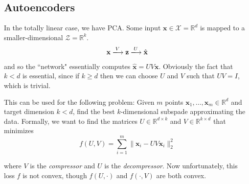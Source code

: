 \documentclass{article}
\begin{document}
\subsection{Autoencoders}

  In the totally linear case, we have PCA. Some input $\mathbf{x} \in \mathcal{X} = \mathbb{R}^d$ is mapped to a smaller-dimensional $\mathcal{Z} = \mathbb{R}^k$. 
  \begin{equation}
    \mathbf{x} \xlongrightarrow[]{V} \mathbf{z} \xlongrightarrow{U} \hat{\mathbf{x}}
  \end{equation}
  and so the ``network" essentially computes $\hat{\mathbf{x}} = U V \mathbf{x}$. Obviously the fact that $k < d$ is essential, since if $k \geq d$ then we can choose $U$ and $V$ such that $UV = I$, which is trivial. 

  This can be used for the following problem: Given $m$ points $\mathbf{x}_1, \ldots, \mathbf{x}_m \in \mathbb{R}^d$ and target dimension $k < d$, find the best $k$-dimensional subspade approximating the data. Formally, we want to find the matrices $U \in \mathbb{R}^{d \times k}$ and $V \in \mathbb{R}^{k \times d}$ that minimizes 
  \begin{equation}
    f(U, V) = \sum_{i=1}^m \|\mathbf{x}_i - U V \mathbf{x}_i\|_2^2
  \end{equation}
   
  where $V$ is the \textit{compressor} and $U$ is the \textit{decompressor}. Now unfortunately, this loss $f$ is not convex, though $f(U, \cdot)$ and $f(\cdot, V)$ are both convex. 
\end{document}
